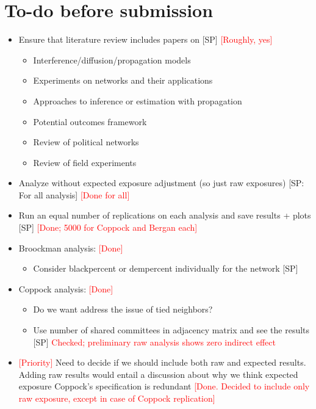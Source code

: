 \documentclass[12pt]{article}
\begin{document}
\thispagestyle{empty}
\doublespacing


\section{To-do before submission}
\begin{itemize}

\item Ensure that literature review includes papers on [SP] \textcolor{red}{[Roughly, yes]}
\begin{itemize}
\item Interference/diffusion/propagation models
\item Experiments on networks and their applications
\item Approaches to inference or estimation with propagation
\item Potential outcomes framework
\item Review of political networks
\item Review of field experiments
\end{itemize}

\item Analyze without expected exposure adjustment (so just raw exposures) [SP: For all analysis] \textcolor{red}{[Done for all]}

\item Run an equal number of replications on each analysis and save results + plots [SP] \textcolor{red}{[Done; 5000 for Coppock and Bergan each]}

\item Broockman analysis: \textcolor{red}{[Done]}
\begin{itemize}
\item Consider blackpercent or dempercent individually for the network [SP]
\end{itemize}

\item Coppock analysis: \textcolor{red}{[Done]}
\begin{itemize}
\item Do we want address the issue of tied neighbors? 
\item Use number of shared committees in adjacency matrix and see the results [SP] \textcolor{red}{Checked; preliminary raw analysis shows zero indirect effect}
\end{itemize}

\item \textcolor{red}{[Priority]} Need to decide if we should include both raw and expected results. Adding raw results would entail a discussion about why we think expected exposure Coppock's specification is redundant \textcolor{red}{[Done. Decided to include only raw exposure, except in case of Coppock replication]}


\end{itemize}
\end{document}
